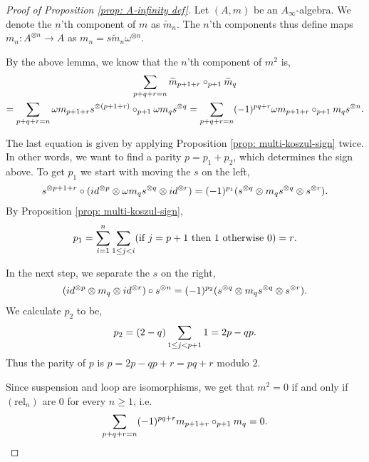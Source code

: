 \documentclass[../thesis.tex]{subfiles}
\begin{document}
        \begin{proof}[Proof of Proposition \ref{prop: A-infinity def}]
            Let $(A,m)$ be an $A_\infty$-algebra. We denote the $n$'th component of $m$ as $\widetilde{m}_n$. The $n$'th components thus define maps $m_n:A^{\otimes n}\rightarrow A$ as $m_n = s\widetilde{m}_n \omega^{\otimes n}$.

            By the above lemma, we know that the $n$'th component of $m^2$ is,
            \begin{multline*}
                \sum_{p + q + r = n}\widetilde{m}_{p+1+r}\circ_{p+1}\widetilde{m}_q \\
                = \sum_{p + q + r = n}\omega m_{p+1+r}s^{\otimes (p+1+r)}\circ_{p+1}\omega m_qs^{\otimes q} = \sum_{p + q + r = n}(-1)^{pq+r}\omega m_{p+1+r}\circ_{p+1}m_q s^{\otimes n}\tt{.}
            \end{multline*}

            The last equation is given by applying Proposition \ref{prop: multi-koszul-sign} twice. In other words, we want to find a parity $p = p_1 + p_2$, which determines the sign above. To get $p_1$ we start with moving the $s$ on the left,
            \begin{align*}
                s^{\otimes p + 1 + r} \circ (id^{\otimes p} \otimes \omega m_q s^{\otimes q} \otimes id^{\otimes r}) = (-1)^{p_1}(s^{\otimes q} \otimes m_q s^{\otimes q} \otimes s^{\otimes r})\tt{.}
            \end{align*}
            By Proposition \ref{prop: multi-koszul-sign},
            \begin{align*}
                p_1 = \sum_{i=1}^n\sum_{1\leq j < i}(\tt{if }j = p+1\tt{ then }1\tt{ otherwise }0) = r\tt{.}
            \end{align*}

            In the next step, we separate the $s$ on the right,
            \begin{align*}
                (id^{\otimes p}\otimes m_q \otimes id^{\otimes r}) \circ s^{\otimes n} = (-1)^{p_2}(s^{\otimes q}\otimes m_qs^{\otimes q}\otimes s^{\otimes r})\tt{.}
            \end{align*}
            We calculate $p_2$ to be,
            \begin{align*}
                p_2 = (2-q)\sum_{1\leq j < p+1}1 = 2p - qp\tt{.}
            \end{align*}
            Thus the parity of $p$ is $p = 2p - qp + r = pq + r$ modulo $2$.

            Since suspension and loop are isomorphisms, we get that $m^2 = 0$ if and only if $(\text{rel}_n)$ are $0$ for every $n\geq 1$, i.e.
            \begin{align*}
                \sum_{p+q+r = n} (-1)^{pq+r} m_{p+1+r} \circ_{p+1} m_q = 0\tt{.}
            \end{align*}
        \end{proof}
\end{document}
